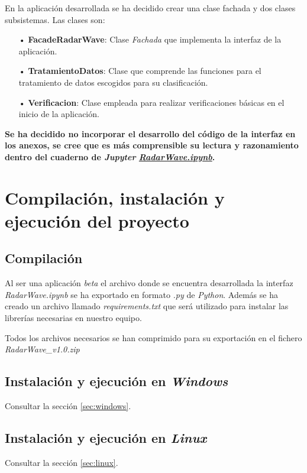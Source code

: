 En la aplicación desarrollada se ha decidido crear una clase fachada y dos clases subsistemas.
Las clases son:
\begin{itemize}
\item[•] \textbf{FacadeRadarWave}: Clase \textit{Fachada} que implementa la interfaz de la aplicación.
\item[•] \textbf{TratamientoDatos}: Clase que comprende las funciones para el tratamiento de datos escogidos para su clasificación.
\item[•] \textbf{Verificacion}: Clase empleada para realizar verificaciones básicas en el inicio de la aplicación.
\end{itemize}

\textbf{Se ha decidido no incorporar el desarrollo del código de la interfaz en los anexos, se cree que es más comprensible su lectura y razonamiento dentro del cuaderno de \textit{Jupyter} \href{https://github.com/mecyc/TFG_RADAR_60GHZ/blob/main/scripts/RadarWave.ipynb}{\textit{RadarWave.ipynb}}.}

\section{Compilación, instalación y ejecución del proyecto}
\subsection{Compilación}
Al ser una aplicación \textit{beta} el archivo donde se encuentra desarrollada la interfaz \textit{RadarWave.ipynb} se ha exportado en formato \textit{.py} de \textit{Python}. Además se ha creado un archivo llamado \textit{requirements.txt} que será utilizado para instalar las librerías necesarias en nuestro equipo.

Todos los archivos necesarios se han comprimido para su exportación en el fichero \textit{RadarWave\_v1.0.zip}

\subsection{Instalación y ejecución en \textit{Windows}}

Consultar la sección \ref{sec:windows}.

\subsection{Instalación y ejecución en \textit{Linux}}

Consultar la sección \ref{sec:linux}.

